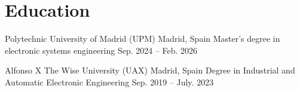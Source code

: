 \section{Education}
  \resumeHeaderItemListStart
    \resumeEduItem
    { Polytechnic University of Madrid (UPM) }{ Madrid, Spain }
    { Master's degree in electronic systems engineering} {Sep. 2024 -- Feb. 2026 }
  
  \resumeEduItem
    { Alfonso X The Wise University (UAX)}{ Madrid, Spain}
    { Degree in Industrial and Automatic Electronic Engineering } {Sep. 2019 -- July. 2023}

  \resumeHeaderItemListEnd
